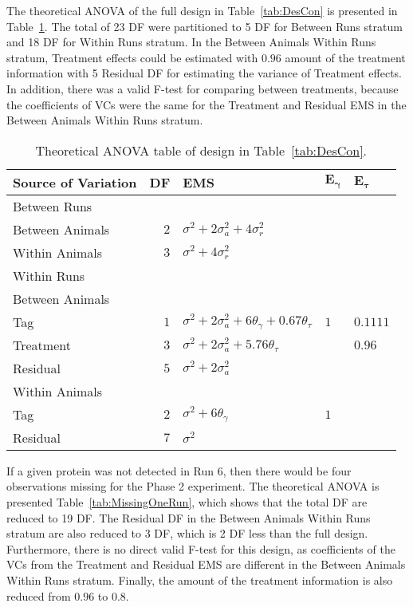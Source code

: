 The theoretical ANOVA of the full design in Table~\ref{tab:DesCon} is presented in Table~\ref{tab:Full}. The total of 23 DF were partitioned to 5 DF for Between Runs stratum and 18 DF for Within Runs stratum. In the Between Animals Within Runs stratum, Treatment effects could be estimated with $0.96$ amount of the treatment information with 5 Residual DF for estimating the variance of Treatment effects. In addition, there was a valid F-test for comparing between treatments, because the coefficients of VCs were the same for the Treatment and Residual EMS in the Between Animals Within Runs stratum.

\begin{table}[!ht]
\centering
 \caption{Theoretical ANOVA table of design in Table~\ref{tab:DesCon}. }
\begin{tabular}[t]{lrlll} 
\toprule 
\multicolumn{1}{l}{\textbf{Source of Variation}} & \multicolumn{1}{l}{\textbf{DF}} & \multicolumn{1}{l}{\textbf{EMS}}&\multicolumn{1}{l}{$\bm{E_{\gamma}}$}&\multicolumn{1}{l}{$\bm{E_{\tau}}$}\\ 
\midrule 
Between Runs &  &  & & \\ 
\quad Between Animals & $2$ & $\sigma^2+2\sigma_{a}^2+4\sigma_{r}^2$ & & \\ 
\quad Within Animals & $3$ & $\sigma^2+4\sigma_{r}^2$ & & \\ \hline 
Within Runs &  &  & & \\ 
\quad Between Animals &  &  & & \\ 
\quad \quad Tag & $1$ & $\sigma^2+2\sigma_{a}^2+6\theta_{\gamma}+0.67\theta_{\tau}$ &$1$ & $0.1111$\\ 
\quad \quad Treatment  & $3$ & $\sigma^2+2\sigma_{a}^2+5.76\theta_{\tau}$ & & $0.96$\\ 
\quad \quad Residual & $5$ & $\sigma^2+2\sigma_{a}^2$ & & \\ \hline 
\quad Within Animals &  &  & & \\ 
\quad \quad Tag & $2$ & $\sigma^2+6\theta_{\gamma}$ &$1$ & \\ 
\quad \quad Residual & $7$ & $\sigma^2$ & & \\ 
\bottomrule 
 \end{tabular} 
 \label{tab:Full} 
\end{table}

If a given protein was not detected in Run 6, then there would be four observations missing for the Phase 2 experiment. The theoretical ANOVA is presented Table~\ref{tab:MissingOneRun}, which shows that the total DF are reduced to 19 DF. The Residual DF in the Between Animals Within Runs stratum are also reduced to 3 DF, which is 2 DF less than the full design. Furthermore, there is no direct valid F-test for this design, as coefficients of the VCs from the Treatment and Residual EMS are different in the Between Animals Within Runs stratum. Finally, the amount of the treatment information is also reduced from $0.96$ to $0.8$. 


